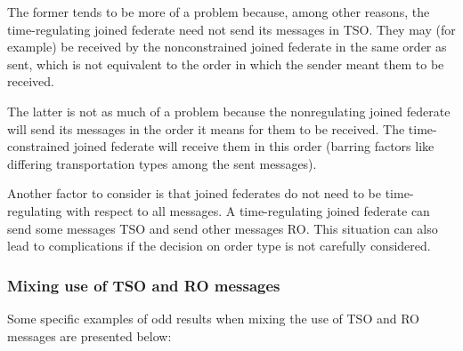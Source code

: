 \begin{compactstdpage}

    The former tends to be more of a problem because, among other reasons, the time-regulating joined federate need not send its messages in TSO. They may (for example) be received by the nonconstrained joined federate in the same order as sent, which is not equivalent to the order in which the sender meant them to be received.

    The latter is not as much of a problem because the nonregulating joined federate will send its messages in the order it means for them to be received. The time-constrained joined federate will receive them in this order (barring factors like differing transportation types among the sent messages).

    Another factor to consider is that joined federates do not need to be time-regulating with respect to all messages. A time-regulating joined federate can send some messages TSO and send other messages RO. This situation can also lead to complications if the decision on order type is not carefully considered.

    \subsubsection{Mixing use of TSO and RO messages}

    Some specific examples of odd results when mixing the use of TSO and RO messages are presented below:



\end{compactstdpage}

\clearpage

